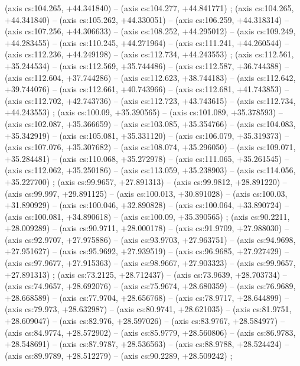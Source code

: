     (axis cs:104.265,    +44.341840) --  (axis cs:104.277,    +44.841771) ;
    (axis cs:104.265,    +44.341840) --  (axis cs:105.262,    +44.330051) --  (axis cs:106.259,    +44.318314) --  (axis cs:107.256,    +44.306633) --  (axis cs:108.252,    +44.295012) --  (axis cs:109.249,    +44.283455) --  (axis cs:110.245,    +44.271964) --  (axis cs:111.241,    +44.260544) --  (axis cs:112.236,    +44.249198) --  (axis cs:112.734,    +44.243553) ;
    (axis cs:112.561,    +35.244534) --  (axis cs:112.569,    +35.744486) --  (axis cs:112.587,    +36.744388) --  (axis cs:112.604,    +37.744286) --  (axis cs:112.623,    +38.744183) --  (axis cs:112.642,    +39.744076) --  (axis cs:112.661,    +40.743966) --  (axis cs:112.681,    +41.743853) --  (axis cs:112.702,    +42.743736) --  (axis cs:112.723,    +43.743615) --  (axis cs:112.734,    +44.243553) ;
    (axis cs:100.09,    +35.390565) --  (axis cs:101.089,    +35.378593) --  (axis cs:102.087,    +35.366659) --  (axis cs:103.085,    +35.354766) --  (axis cs:104.083,    +35.342919) --  (axis cs:105.081,    +35.331120) --  (axis cs:106.079,    +35.319373) --  (axis cs:107.076,    +35.307682) --  (axis cs:108.074,    +35.296050) --  (axis cs:109.071,    +35.284481) --  (axis cs:110.068,    +35.272978) --  (axis cs:111.065,    +35.261545) --  (axis cs:112.062,    +35.250186) --  (axis cs:113.059,    +35.238903) --  (axis cs:114.056,    +35.227700) ;
    (axis cs:99.9657,    +27.891313) --  (axis cs:99.9812,    +28.891220) --  (axis cs:99.997,    +29.891125) --  (axis cs:100.013,    +30.891028) --  (axis cs:100.03,    +31.890929) --  (axis cs:100.046,    +32.890828) --  (axis cs:100.064,    +33.890724) --  (axis cs:100.081,    +34.890618) --  (axis cs:100.09,    +35.390565) ;
    (axis cs:90.2211,    +28.009289) --  (axis cs:90.9711,    +28.000178) --  (axis cs:91.9709,    +27.988030) --  (axis cs:92.9707,    +27.975886) --  (axis cs:93.9703,    +27.963751) --  (axis cs:94.9698,    +27.951627) --  (axis cs:95.9692,    +27.939519) --  (axis cs:96.9685,    +27.927429) --  (axis cs:97.9677,    +27.915363) --  (axis cs:98.9667,    +27.903323) --  (axis cs:99.9657,    +27.891313) ;
    (axis cs:73.2125,    +28.712437) --  (axis cs:73.9639,    +28.703734) --  (axis cs:74.9657,    +28.692076) --  (axis cs:75.9674,    +28.680359) --  (axis cs:76.9689,    +28.668589) --  (axis cs:77.9704,    +28.656768) --  (axis cs:78.9717,    +28.644899) --  (axis cs:79.973,    +28.632987) --  (axis cs:80.9741,    +28.621035) --  (axis cs:81.9751,    +28.609047) --  (axis cs:82.976,    +28.597026) --  (axis cs:83.9767,    +28.584977) --  (axis cs:84.9774,    +28.572902) --  (axis cs:85.9779,    +28.560806) --  (axis cs:86.9783,    +28.548691) --  (axis cs:87.9787,    +28.536563) --  (axis cs:88.9788,    +28.524424) --  (axis cs:89.9789,    +28.512279) --  (axis cs:90.2289,    +28.509242) ;
